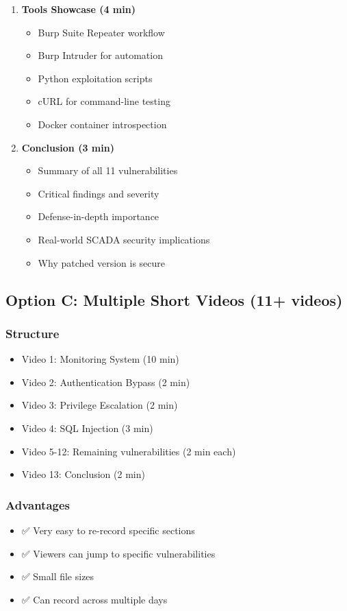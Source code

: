 \documentclass[12pt,a4paper]{article}
\begin{document}
\begin{enumerate}[leftmargin=*]
    \item \textbf{Tools Showcase (4 min)}
    \begin{itemize}
        \item Burp Suite Repeater workflow
        \item Burp Intruder for automation
        \item Python exploitation scripts
        \item cURL for command-line testing
        \item Docker container introspection
    \end{itemize}
    
    \item \textbf{Conclusion (3 min)}
    \begin{itemize}
        \item Summary of all 11 vulnerabilities
        \item Critical findings and severity
        \item Defense-in-depth importance
        \item Real-world SCADA security implications
        \item Why patched version is secure
    \end{itemize}
\end{enumerate}

\subsection{Option C: Multiple Short Videos (11+ videos)}

\subsubsection{Structure}
\begin{itemize}[leftmargin=*]
    \item Video 1: Monitoring System (10 min)
    \item Video 2: Authentication Bypass (2 min)
    \item Video 3: Privilege Escalation (2 min)
    \item Video 4: SQL Injection (3 min)
    \item Video 5-12: Remaining vulnerabilities (2 min each)
    \item Video 13: Conclusion (2 min)
\end{itemize}

\subsubsection{Advantages}
\begin{itemize}[leftmargin=*]
    \item ✅ Very easy to re-record specific sections
    \item ✅ Viewers can jump to specific vulnerabilities
    \item ✅ Small file sizes
    \item ✅ Can record across multiple days
\end{itemize}
\end{document}
